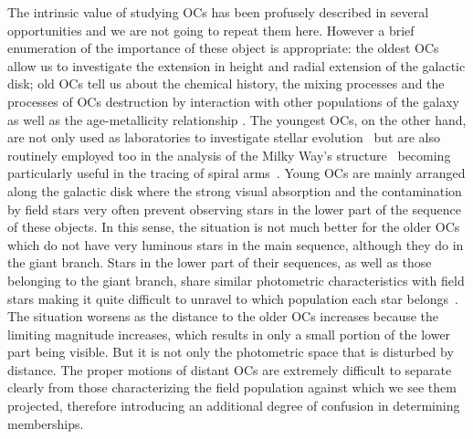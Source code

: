 \documentclass[draft]{aa}
\begin{document}
 The intrinsic value of studying OCs has been profusely described in several
 opportunities and we are not going to repeat them here. However a brief
 enumeration of the importance of these object is appropriate: the oldest OCs
 allow us to investigate the extension in height and radial extension of the
 galactic disk; old OCs tell us about the chemical history, the mixing processes
 and the processes of OCs destruction by interaction with other populations of
 the galaxy as well as the age-metallicity relationship 
 \citep{Friel1995,Tosi_2004,Hayes_2015}. The youngest OCs, on the other hand, are
 not only used as laboratories to investigate stellar evolution~\citep[they allow
 studying in detail the boundary conditions necessary to create new generations
 of stars, ][]{Lada2003} but are also routinely employed too in the analysis
 of the Milky Way's
 structure~\citep{Loktin_1992,Moitinho_2006,Vazquez2008,Moitinho_2010}
 becoming particularly useful in the tracing of spiral
 arms~\citep{carraro_2013,Molina_2018}.
 Young OCs are mainly arranged along the galactic disk where the strong visual
 absorption and the contamination by field stars very often prevent observing
 stars in the lower part of the sequence of these objects.
 In this sense, the situation is not much better for the older OCs which do not
 have very luminous stars in the main sequence, although they do in the giant
 branch. Stars in the lower part of their sequences, as well as those belonging
 to the giant branch, share similar photometric characteristics with field stars
 making it quite difficult to unravel to which population each star
 belongs~\citep{Hayes_2015}.
 The situation worsens as the distance to the older OCs increases because the
 limiting magnitude increases, which results in only a small portion of
 the lower part being visible. But it is not only the photometric
 space that is disturbed by distance. The proper motions of distant OCs are
 extremely difficult to separate clearly from those characterizing the field
 population against which we see them projected, therefore introducing an
 additional degree of confusion in determining memberships.
\end{document}
